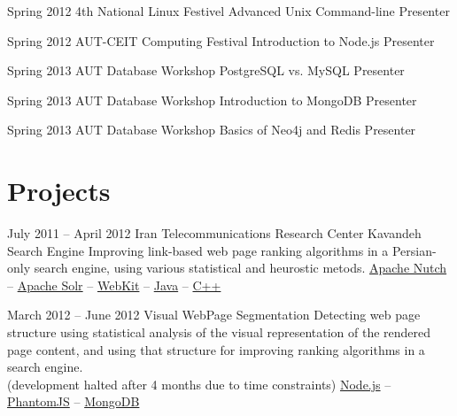 \documentclass{tccv}
\begin{document}
{{\begin{teaching}


\item{Spring 2012}
	 {4th National Linux Festivel}
	 {Advanced Unix Command-line}
	 {Presenter}


\item{Spring 2012}
	 {AUT-CEIT Computing Festival}
	 {Introduction to Node.js}
	 {Presenter}


\item{Spring 2013}
	 {AUT Database Workshop}
	 {PostgreSQL vs. MySQL}
	 {Presenter}


\item{Spring 2013}
	 {AUT Database Workshop}
	 {Introduction to MongoDB}
	 {Presenter}


\item{Spring 2013}
	 {AUT Database Workshop}
	 {Basics of Neo4j and Redis}
	 {Presenter}

\end{teaching}










\section{Projects}

\begin{project_list}

\item{July 2011 -- April 2012}
     {Iran Telecommunications Research Center}
     {Kavandeh Search Engine}
	 {Improving link-based web page ranking algorithms in a Persian-only search engine, using various statistical and heurostic metods.}
     {
     	\href{http://nutch.apache.org}{Apache Nutch} -- 
		\href{http://lucene.apache.org/solr/}{Apache Solr} -- 
		\href{http://www.webkit.org}{WebKit} -- 
		\href{http://www.oracle.com/technetwork/java/}{Java} -- 
		\href{https://en.wikipedia.org/wiki/C\%2B\%2B}{C++}
	}

\vspace{5pt}

\item{March 2012 -- June 2012}
     {}
     {Visual WebPage Segmentation}
	 {Detecting web page structure using statistical analysis of the visual representation of the rendered page content, and using that structure for improving ranking algorithms in a search engine.\\
(development halted after 4 months due to time constraints)}
	 {
	 	\href{http://nodejs.org}{Node.js} -- 
		\href{http://phantomjs.org}{PhantomJS} -- 
		\href{http://www.mongodb.org}{MongoDB}
	 }



\end{project_list}}}
\end{document}
